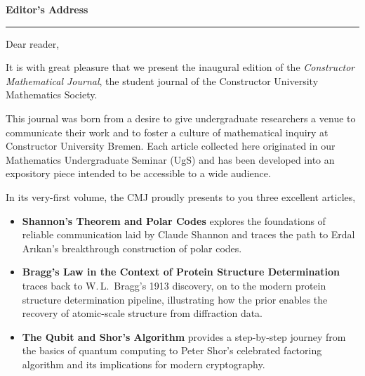 \clearpage
\thispagestyle{frontmatter}

\vspace*{0.5cm}

\begin{center}
  {\LARGE\bfseries\color{cmjcrimson}Editor's Address}\label{art:address}
\end{center}

\vspace{0.3cm}
\noindent\textcolor{cmjgold}{\rule{\textwidth}{1.2pt}}
\vspace{0.3cm}

\noindent Dear reader,

\vspace{0.25cm}

It is with great pleasure that we present the inaugural edition of the
{\color{cmjcrimson}\textit{Constructor Mathematical Journal}}, the student journal of the
Constructor University Mathematics Society.

\vspace{0.25cm}

This journal was born from a desire to give undergraduate researchers a venue
to communicate their work and to foster a culture of mathematical inquiry at
Constructor University Bremen. Each article collected here originated in our
Mathematics Undergraduate Seminar (UgS) and has been developed into an expository
piece intended to be accessible to a wide audience.

\vspace{0.25cm}

In its very-first volume, the {\color{cmjcrimson}CMJ} proudly presents to you
three excellent articles,

\begin{itemize}[leftmargin=1.5em, itemsep=0.3em]
  \item \textbf{Shannon's Theorem and Polar Codes} explores the foundations
        of reliable communication laid by Claude Shannon and traces the path
        to Erdal Ar{\i}kan's breakthrough construction of polar codes.
  \item \textbf{Bragg's Law in the Context of Protein Structure Determination}
        traces back to W.\,L.\ Bragg's 1913 discovery, on to the modern protein structure
        determination pipeline, illustrating how the prior enables the recovery of atomic-scale structure
        from diffraction data.
  \item \textbf{The Qubit and Shor's Algorithm} provides a step-by-step
        journey from the basics of quantum computing to Peter Shor's
        celebrated factoring algorithm and its implications for modern
        cryptography.
\end{itemize}

